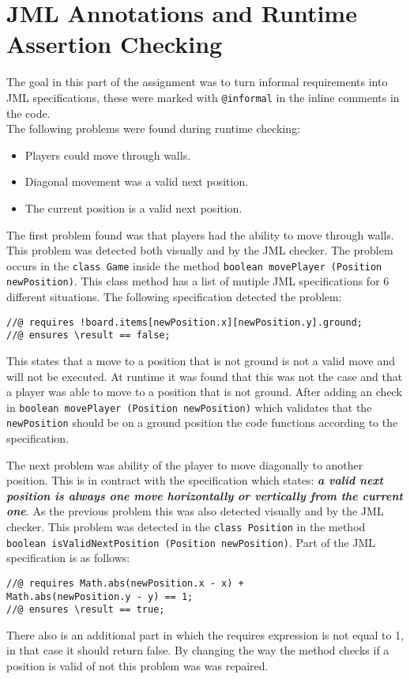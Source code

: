 \documentclass[a4paper]{article}
\begin{document}
	\section{JML Annotations and Runtime Assertion Checking}
	The goal in this part of the assignment was to turn informal requirements into JML specifications, these were marked with \texttt{@informal} in the inline comments in the code. \\
	The following problems were found during runtime checking:
	\begin{itemize}
		\item Players could move through walls.
		\item Diagonal movement was a valid next position.
		\item The current position is a valid next position.
	\end{itemize}
	The first problem found was that players had the ability to move through walls. This problem was detected both visually and by the JML checker. The problem occurs in the \texttt{class Game} inside the method \texttt{boolean movePlayer (Position newPosition)}. This class method has a list of mutiple JML specifications for 6 different situations. The following specification detected the problem:
	\begin{lstlisting}
//@ requires !board.items[newPosition.x][newPosition.y].ground;
//@ ensures \result == false;
	\end{lstlisting}
	This states that a move to a position that is not ground is not a valid move and will not be executed. At runtime it was found that this was not the case and that a player was able to move to a position that is not ground. After adding an check in \texttt{boolean movePlayer (Position newPosition)} which validates that the \texttt{newPosition} should be on a ground position the code functions according to the specification.
	
	The next problem was ability of the player to move diagonally to another position. This is in contract with the specification which states: \textbf{\textit{a valid next position is always one move horizontally or vertically from the current one}}. As the previous problem this was also detected visually and by the JML checker. This problem was detected in the \texttt{class Position} in the method \texttt{boolean isValidNextPosition (Position newPosition)}. Part of the JML specification is as follows:
	\begin{lstlisting}
//@ requires Math.abs(newPosition.x - x) + 
Math.abs(newPosition.y - y) == 1;
//@ ensures \result == true;
	\end{lstlisting}
	There also is an additional part in which the requires expression is not equal to 1, in that case it should return false. By changing the way the method checks if a position is valid of not this problem was was repaired.
	
\end{document}
